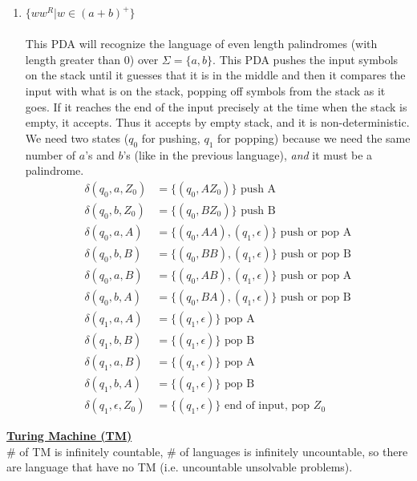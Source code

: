 \documentclass[8pt,letterpaper,twocolumn]{article}
\begin{document}
\begin{enumerate}
  \item %
  $\{ww^R|w \in (a+b)^+\}$ \\
  \\
  This PDA will recognize the language of even length palindromes (with length greater than 0)
  over $\Sigma = \{a,b\}$. This PDA pushes the input symbols on the stack until it guesses that it is
  in the middle and then it compares the input with what is on the stack, popping off symbols from the
  stack as it goes. If it reaches the end of the input precisely at the time when the stack is empty,
  it accepts. Thus it accepts by empty stack, and it is non-deterministic.
  We need two states ($q_0$ for pushing, $q_1$ for popping) because we need the same number of
  $a$'s and $b$'s (like in the previous language), \emph{and} it must be a palindrome.
  \begin{align*}
    \delta(q_0, a, Z_0) &= \{(q_0, AZ_0)\} \mbox{ push A} \\
    \delta(q_0, b, Z_0) &= \{(q_0, BZ_0)\} \mbox{ push B} \\
    \delta(q_0, a, A) &= \{(q_0, AA), (q_1, \epsilon)\} \mbox{ push or pop A} \\
    \delta(q_0, b, B) &= \{(q_0, BB), (q_1, \epsilon)\} \mbox{ push or pop B} \\
    \delta(q_0, a, B) &= \{(q_0, AB), (q_1, \epsilon)\} \mbox{ push or pop A} \\
    \delta(q_0, b, A) &= \{(q_0, BA), (q_1, \epsilon)\} \mbox{ push or pop B} \\
    \delta(q_1, a, A) &= \{(q_1, \epsilon)\} \mbox{ pop A} \\
    \delta(q_1, b, B) &= \{(q_1, \epsilon)\} \mbox{ pop B} \\
    \delta(q_1, a, B) &= \{(q_1, \epsilon)\} \mbox{ pop A} \\
    \delta(q_1, b, A) &= \{(q_1, \epsilon)\} \mbox{ pop B} \\
    \delta(q_1, \epsilon, Z_0) &= \{(q_1, \epsilon)\} \mbox{ end of input, pop } Z_0
  \end{align*}
\end{enumerate}
\underline{\textbf{Turing Machine (TM)}} \\
\# of TM is infinitely countable, \# of languages is infinitely uncountable,
so there are language that have no TM (i.e. uncountable unsolvable problems).
\end{document}
